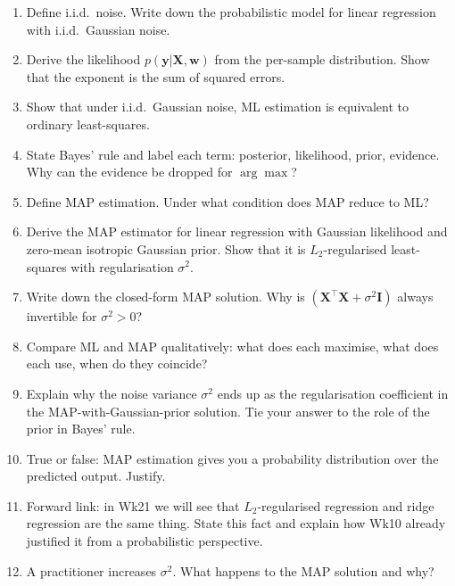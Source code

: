 \documentclass[11pt, a4paper]{article}
\begin{document}
\begin{enumerate}
  \item Define i.i.d.\ noise. Write down the probabilistic model for linear regression with i.i.d.\ Gaussian noise.
  \item Derive the likelihood $p(\mathbf{y}|\mathbf{X},\mathbf{w})$ from the per-sample distribution. Show that the exponent is the sum of squared errors.
  \item Show that under i.i.d.\ Gaussian noise, ML estimation is equivalent to ordinary least-squares.
  \item State Bayes' rule and label each term: posterior, likelihood, prior, evidence. Why can the evidence be dropped for $\arg\max$?
  \item Define MAP estimation. Under what condition does MAP reduce to ML?
  \item Derive the MAP estimator for linear regression with Gaussian likelihood and zero-mean isotropic Gaussian prior. Show that it is $L_2$-regularised least-squares with regularisation $\sigma^2$.
  \item Write down the closed-form MAP solution. Why is $(\mathbf{X}^\top\mathbf{X} + \sigma^2\mathbf{I})$ always invertible for $\sigma^2 > 0$?
  \item Compare ML and MAP qualitatively: what does each maximise, what does each use, when do they coincide?
  \item Explain why the noise variance $\sigma^2$ ends up as the regularisation coefficient in the MAP-with-Gaussian-prior solution. Tie your answer to the role of the prior in Bayes' rule.
  \item True or false: MAP estimation gives you a probability distribution over the predicted output. Justify.
  \item Forward link: in Wk21 we will see that $L_2$-regularised regression and ridge regression are the same thing. State this fact and explain how Wk10 already justified it from a probabilistic perspective.
  \item A practitioner increases $\sigma^2$. What happens to the MAP solution and why?
\end{enumerate}
\end{document}
